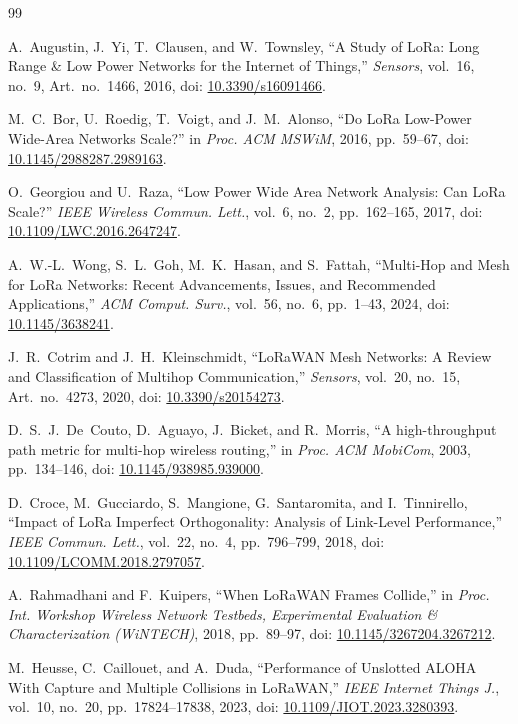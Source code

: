 \begin{thebibliography}{99}

A.~Augustin, J.~Yi, T.~Clausen, and W.~Townsley,
``A Study of LoRa: Long Range \& Low Power Networks for the Internet of Things,''
\emph{Sensors}, vol.~16, no.~9, Art.~no.~1466, 2016,
doi: \url{10.3390/s16091466}.

M.~C.~Bor, U.~Roedig, T.~Voigt, and J.~M.~Alonso,
``Do LoRa Low-Power Wide-Area Networks Scale?''
in \emph{Proc. ACM MSWiM}, 2016, pp.~59--67,
doi: \url{10.1145/2988287.2989163}.

O.~Georgiou and U.~Raza,
``Low Power Wide Area Network Analysis: Can LoRa Scale?''
\emph{IEEE Wireless Commun. Lett.}, vol.~6, no.~2, pp.~162--165, 2017,
doi: \url{10.1109/LWC.2016.2647247}.

A.~W.-L.~Wong, S.~L.~Goh, M.~K.~Hasan, and S.~Fattah,
``Multi-Hop and Mesh for LoRa Networks: Recent Advancements, Issues, and Recommended Applications,''
\emph{ACM Comput. Surv.}, vol.~56, no.~6, pp.~1--43, 2024,
doi: \url{10.1145/3638241}.

J.~R.~Cotrim and J.~H.~Kleinschmidt,
``LoRaWAN Mesh Networks: A Review and Classification of Multihop Communication,''
\emph{Sensors}, vol.~20, no.~15, Art.~no.~4273, 2020,
doi: \url{10.3390/s20154273}.

D.~S.~J.~De~Couto, D.~Aguayo, J.~Bicket, and R.~Morris,
``A high-throughput path metric for multi-hop wireless routing,''
in \emph{Proc. ACM MobiCom}, 2003, pp.~134--146,
doi: \url{10.1145/938985.939000}.

D.~Croce, M.~Gucciardo, S.~Mangione, G.~Santaromita, and I.~Tinnirello,
``Impact of LoRa Imperfect Orthogonality: Analysis of Link-Level Performance,''
\emph{IEEE Commun. Lett.}, vol.~22, no.~4, pp.~796--799, 2018,
doi: \url{10.1109/LCOMM.2018.2797057}.

A.~Rahmadhani and F.~Kuipers,
``When LoRaWAN Frames Collide,''
in \emph{Proc. Int. Workshop Wireless Network Testbeds, Experimental Evaluation \& Characterization (WiNTECH)}, 2018, pp.~89--97,
doi: \url{10.1145/3267204.3267212}.

M.~Heusse, C.~Caillouet, and A.~Duda,
``Performance of Unslotted ALOHA With Capture and Multiple Collisions in LoRaWAN,''
\emph{IEEE Internet Things J.}, vol.~10, no.~20, pp.~17824--17838, 2023,
doi: \url{10.1109/JIOT.2023.3280393}.


\end{thebibliography}
